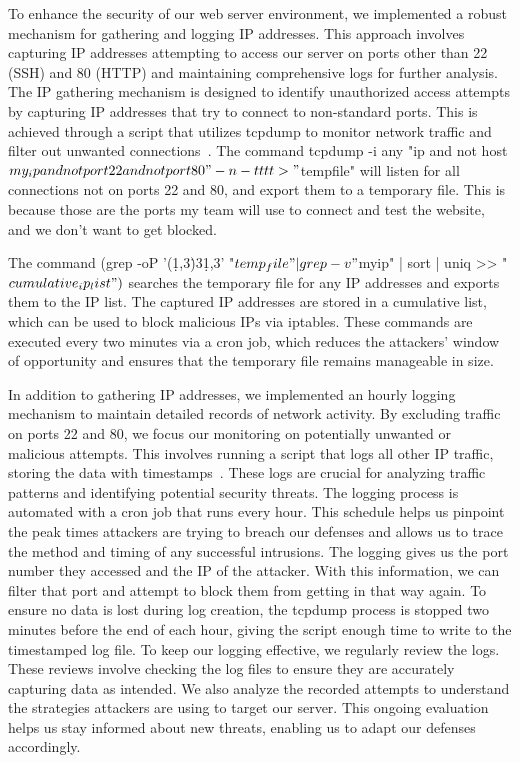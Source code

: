 To enhance the security of our web server environment, we implemented a robust mechanism for gathering and logging IP addresses. This approach involves capturing IP addresses attempting to access our server on ports other than 22 (SSH) and 80 (HTTP) and maintaining comprehensive logs for further analysis.
The IP gathering mechanism is designed to identify unauthorized access attempts by capturing IP addresses that try to connect to non-standard ports. This is achieved through a script that utilizes tcpdump to monitor network traffic and filter out unwanted connections~\cite{TechTarget_Net}. The command tcpdump -i any "ip and not host $my_ip and not port 22 and not port 80" -n -tttt > "$tempfile" will listen for all connections not on ports 22 and 80, and export them to a temporary file. This is because those are the ports my team will use to connect and test the website, and we don't want to get blocked.

The command (grep -oP '(\d{1,3}\.){3}\d{1,3}' "$temp_file" | grep -v "$myip" | sort | uniq >> "$cumulative_ip_list")$ searches the temporary file for any IP addresses and exports them to the IP list. The captured IP addresses are stored in a cumulative list, which can be used to block malicious IPs via iptables. These commands are executed every two minutes via a cron job, which reduces the attackers' window of opportunity and ensures that the temporary file remains manageable in size.

In addition to gathering IP addresses, we implemented an hourly logging mechanism to maintain detailed records of network activity. By excluding traffic on ports 22 and 80, we focus our monitoring on potentially unwanted or malicious attempts. This involves running a script that logs all other IP traffic, storing the data with timestamps~\cite{Schwartz_TCPDUMP}. These logs are crucial for analyzing traffic patterns and identifying potential security threats. The logging process is automated with a cron job that runs every hour. This schedule helps us pinpoint the peak times attackers are trying to breach our defenses and allows us to trace the method and timing of any successful intrusions. The logging gives us the port number they accessed and the IP of the attacker. With this information, we can filter that port and attempt to block them from getting in that way again. To ensure no data is lost during log creation, the tcpdump process is stopped two minutes before the end of each hour, giving the script enough time to write to the timestamped log file. To keep our logging effective, we regularly review the logs. These reviews involve checking the log files to ensure they are accurately capturing data as intended. We also analyze the recorded attempts to understand the strategies attackers are using to target our server. This ongoing evaluation helps us stay informed about new threats, enabling us to adapt our defenses accordingly.
